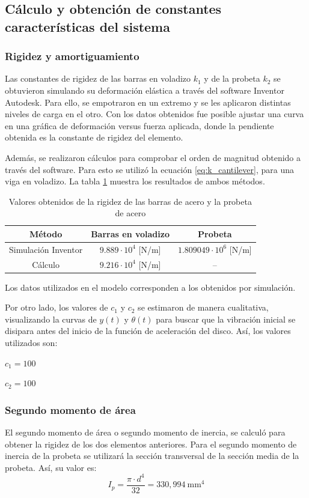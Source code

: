 \subsection{Cálculo y obtención de constantes características del sistema}
 
\subsubsection{Rigidez y amortiguamiento} Las constantes de rigidez de las barras en voladizo $k_1$ y de la probeta $k_2$ se obtuvieron simulando su deformación elástica a través del software Inventor Autodesk. Para ello, se empotraron en un extremo y se les aplicaron distintas niveles de carga en el otro. Con los datos obtenidos fue posible ajustar una curva en una gráfica de deformación versus fuerza aplicada, donde la pendiente obtenida es la constante de rigidez del elemento. 

Además, se realizaron cálculos para comprobar el orden de magnitud obtenido a través del software. Para esto se utilizó la ecuación \ref{eq:k_cantilever}, para una viga en voladizo. La tabla \ref{tab:k_valor} muestra los resultados de ambos métodos.
\begin{table}[h]
\centering
\begin{tabular}{ccc}
\hline
Método & Barras en voladizo & Probeta \\ \hline
Simulación Inventor & $9.889\cdot 10^4$ [N/m] & $1.809049\cdot 10^6$ [N/m] \\
Cálculo & $9.216\cdot 10^4$ [N/m] & -- \\ \hline
\end{tabular}
\caption{Valores obtenidos de la rigidez de las barras de acero y la probeta de acero}
\label{tab:k_valor}
\end{table}
Los datos utilizados en el modelo corresponden a los obtenidos por simulación.

Por otro lado, los valores de $c_1$ y $c_2$ se estimaron de manera cualitativa, visualizando la curvas de $y(t)$ y $\theta(t)$ para buscar que la vibración inicial se disipara antes del inicio de la función de aceleración del disco. Así, los valores utilizados son:
\begin{itemize*}
	\item $c_1= 100$
	\item $c_2= 100$ 
\end{itemize*}
\subsubsection{Segundo momento de área}
El segundo momento de área o segundo momento de inercia, se calculó para obtener la rigidez de los dos elementos anteriores. Para el segundo momento de inercia de la probeta se utilizará la sección transversal de la sección media de la probeta. Así, su valor es:
\begin{equation}
	I_p = \frac{\pi \cdot d^4}{32} = 330,994\: \text{mm}^4
\end{equation}

